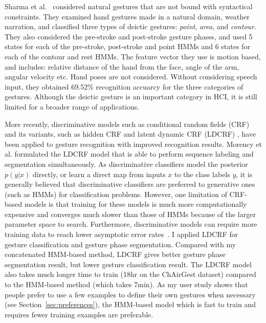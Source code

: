 Sharma et al.~\cite{sharma00} considered natural gestures that are not
bound with syntactical constraints. They examined hand gestures made in a
natural domain, weather narration, and classified three types of
deictic gestures:
\textit{point}, \textit{area}, and \textit{contour}. They also
considered the pre-stroke and post-stroke gesture phases, and used 5 states for
each of the pre-stroke, post-stroke and point HMMs and 6 states for each of the
contour and rest HMMs. The feature vector they use is motion based, and
includes: relative distance of the hand from the face, angle of the arm, angular
velocity etc. Hand poses are not considered. Without considering speech input,
they obtained 69.52\% recognition accuarcy for the three categories of gestures.
Although the deictic gesture is an important category in HCI, it is still
limited for a broader range of applications.

More recently, discriminative models such as
conditional random fields (CRF) and its variants, such as hidden CRF
\cite{wang06} and latent dynamic CRF (LDCRF) \cite{morency07}, have been
applied to gesture recognition with improved recognition results. Morency et al.
\cite{morency07} formulated the LDCRF model that is able to perform sequence labeling and segmentation simultaneously. 
As
discriminative classifiers model the posterior $p(y|x)$ directly, or
learn a direct map from inputs $x$ to the class labels $y$, it is
generally believed that discriminative classifiers are preferred to
generative ones (such as HMMs) for classification problems.
However, one limitation of CRF-based models is that training for these models
is much more computationally expensive and converges much slower than those of
HMMs \cite{lafferty01} because of the larger parameter space to search.
Furthermore, discriminative models can require more training data to reach
lower asymptotic error rates~\cite{ng02}. I applied LDCRF for gesture
classification and gesture phase segmentation.
Compared with my concatenated HMM-based method, LDCRF gives better gesture phase
segmentation result, but lower gesture classification result. The LDCRF model
also takes much longer time to train (18hr on the ChAirGest dataset) compared to
the HMM-based method (which takes 7min). As my user study shows that people
prefer to use a few examples to define their own gestures when necessary (see
Section~\ref{sec:preferences}), the HMM-based model which is fast to train and
requires fewer training examples are preferable.

